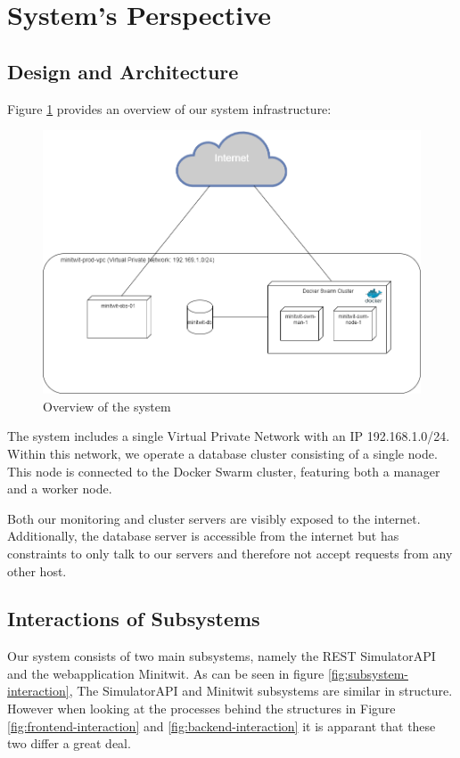 \section{System's Perspective}

\subsection{Design and Architecture}
Figure \ref{fig:systemoverview} provides an overview of our system infrastructure:
\begin{figure}[H]
    \centering
    \includegraphics[width=0.7\linewidth]{images/system-overview2.png}
    \caption{Overview of the system}
    \label{fig:systemoverview}

\end{figure}
The system includes a single Virtual Private Network with an IP 192.168.1.0/24. Within this network, we operate a database cluster consisting of a single node. This node is connected to the Docker Swarm cluster, featuring both a manager and a worker node.

Both our monitoring and cluster servers are visibly exposed to the internet. Additionally, the database server is accessible from the internet but has constraints to only talk to our servers and therefore not accept requests from any other host.

\subsection{Interactions of Subsystems}
Our system consists of two main subsystems, namely the REST SimulatorAPI and the webapplication Minitwit. As can be seen in figure \ref{fig:subsystem-interaction}, The SimulatorAPI and Minitwit subsystems are similar in structure. However when looking at the processes behind the structures in Figure \ref{fig:frontend-interaction} and \ref{fig:backend-interaction} it is apparant that these two differ a great deal.

